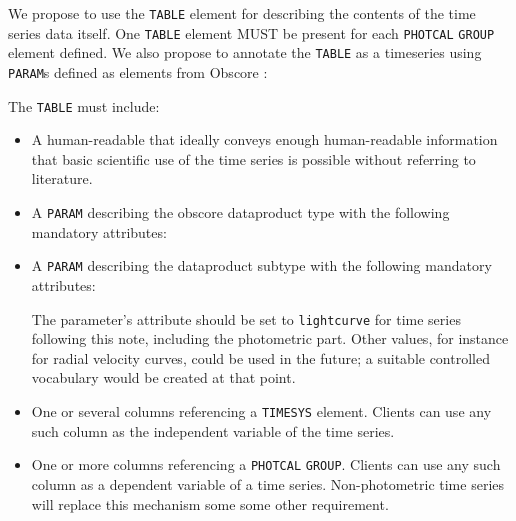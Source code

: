 \documentclass[11pt,a4paper]{ivoa} 
\let\fg=\color
\def\elem#1{{\tt{\fg{DarkRed}#1}}}
\def\attrval#1#2{{\tt{\fg{DarkRed}#1}="{\fg{DarkPurple}#2}"}}
\begin{document}
We propose to use the \elem{TABLE} element for describing the contents
of the time series data itself. One \elem{TABLE} element MUST be
present for each \elem{PHOTCAL} \elem{GROUP} element defined. We also
propose to annotate the \elem{TABLE} as a timeseries using
\elem{PARAM}s defined as elements from Obscore
\citep{2017ivoa.spec.0509L}:

The \elem{TABLE} must include:

\begin{itemize}
\item A human-readable  that ideally conveys enough
  human-readable information that basic scientific use of the time
  series is possible without referring to literature.

\item A \elem{PARAM} describing the obscore dataproduct type with the
  following mandatory attributes:

\item A \elem{PARAM} describing the dataproduct subtype with the
  following mandatory attributes:


The parameter's  attribute should be set to
\texttt{lightcurve} for time series following this note, including the
photometric part.  Other values, for instance for radial velocity
curves, could be used in the future; a suitable controlled vocabulary
would be created at that point.

     \item One or several columns referencing a \elem{TIMESYS}
       element.  Clients can use any such column as the independent
       variable of the time series.

     \item One or more columns referencing a \texttt{PHOTCAL}
       \elem{GROUP}.  Clients can use any such column as a dependent
       variable of a time series.  Non-photometric time series will
       replace this mechanism some some other requirement.
\end{itemize}
\end{document}

